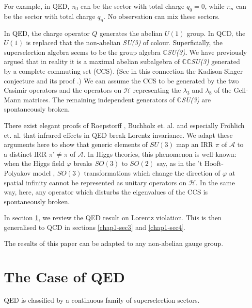 For example, in QED, $\pi_{0}$ can be the sector with total charge $q_{0}= 0$, while $\pi_{n}$ can be the sector with total charge $q_{n}$. No observation can mix these sectors.

In QED, the charge operator $Q$ generates the abelian $U(1)$ group. In QCD, the $U(1)$ is replaced that the non-abelian \textit{SU(3)} of colour. Superficially, the superselection algebra seems to be the group algebra $\mathbb{C}$\textit{SU(3)}. We have previously argued \cite{key1} that in reality it is a maximal abelian subalgebra of $\mathbb{CC}$\textit{SU(3)} generated by a complete commuting set (CCS). (See in this connection the Kadison-Singer conjecture and its proof \cite{key5}.) We can assume the CCS to be generated by the two Casimir operators and the operators on $\mathcal{H}$ representing the $\lambda_{3}$ and $\lambda_{8}$ of the Gell-Mann matrices. The remaining independent generators of $\mathbb{C}$\textit{SU(3)} are spontaneously broken.

There exist elegant proofs of Roepstorff \cite{key6}, Buchholz et. al. \cite{key2} and especially Fr\"ohlich et. al. \cite{key3} that infrared effects in QED break Lorentz invariance. We adapt these arguments here to show that generic elements of $SU(3)$ map an IRR $\pi$ of $\mathcal{A}$ to a distinct IRR $\pi'\neq \pi$ of $\mathcal{A}$. In Higgs theories, this phenomenon is well-known: when the Higgs field $\varphi$ breaks $SO(3)$ to $SO(2)$ say, as in the 't Hooft-Polyakov model \cite{key7}, $SO(3)$ transformations which change the direction of $\varphi$ at spatial infinity cannot be represented as unitary operators on $\mathcal{H}$. In the same way, here, any operator which disturbs the eigenvalues of the CCS is spontaneously broken.

In section \ref{chap1-sec2}, we review the QED result on Lorentz violation. This is then generalised to QCD in sections \ref{chap1-sec3} and \ref{chap1-sec4}.

The results of this paper can be adapted to any non-abelian gauge group.

\vspace{-.3cm}

\section{The Case of QED}\label{chap1-sec2}

\vspace{-.2cm}

QED is classified by a continuous family of superselection sectors.

